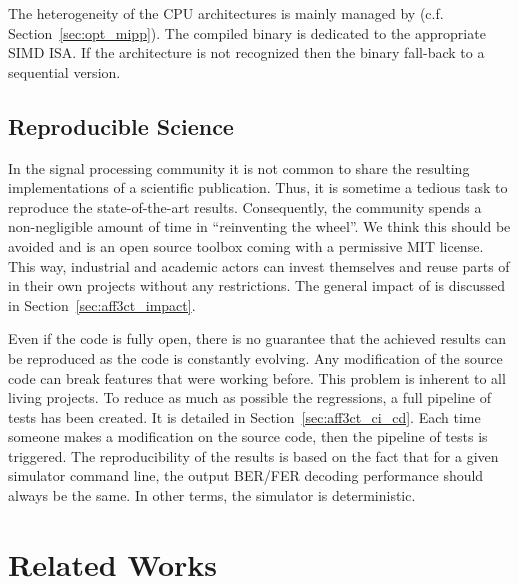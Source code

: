 The heterogeneity of the CPU architectures is mainly managed by \MIPP (c.f.
Section~\ref{sec:opt_mipp}). The compiled binary is dedicated to the appropriate
SIMD ISA. If the architecture is not recognized then the \AFFECT binary
fall-back to a sequential version.

\subsection{Reproducible Science}

In the signal processing community it is not common to share the resulting
implementations of a scientific publication. Thus, it is sometime a tedious task
to reproduce the state-of-the-art results. Consequently, the community spends a
non-negligible amount of time in ``reinventing the wheel''. We think this should
be avoided and \AFFECT is an open source toolbox coming with a permissive MIT
license. This way, industrial and academic actors can invest themselves and
reuse parts of \AFFECT in their own projects without any restrictions. The
general impact of \AFFECT is discussed in Section~\ref{sec:aff3ct_impact}.

Even if the code is fully open, there is no guarantee that the achieved results
can be reproduced as the code is constantly evolving. Any modification of the
source code can break features that were working before. This problem is
inherent to all living projects. To reduce as much as possible the regressions,
a full pipeline of tests has been created. It is detailed in
Section~\ref{sec:aff3ct_ci_cd}. Each time someone makes a modification on the
\AFFECT source code, then the pipeline of tests is triggered. The
reproducibility of the results is based on the fact that for a given \AFFECT
simulator command line, the output BER/FER decoding performance should always be
the same. In other terms, the \AFFECT simulator is deterministic.

\section{Related Works}
\label{sec:aff3ct_related_works}

